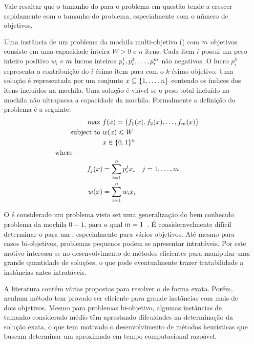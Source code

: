 Vale resaltar que o tamanho do \paretoset para o problema em questão
tende a crescer rapidamente com o tamanho do problema, especialmente com o
número de objetivos.

Uma instância de um problema da mochila multi-objetivo (\mokp{}) com $m$
objetivos consiste em uma capacidade inteira $W >0$ e $n$ itens.
Cada item $i$ possui um peso inteiro positivo $w_i$ e $m$ lucros inteiros
$p_i^1, p_i^2, \ldots, p_{i}^{m}$ não negativos.
O lucro $p_i^k$ representa a contribuição do $i$-ésimo item
para com o $k$-ésimo objetivo.
Uma solução é representada por um conjunto $x \subseteq \{1, \ldots, n\}$
contendo os índices dos itens incluídos na mochila.
Uma solução é viável se o peso total incluído na mochila não ultrapassa
a capacidade da mochila.
Formalmente a definição do problema é a seguinte:
\begin{align*}
  \text{max   } & f(x) =
    \big(f_1(x) ,f_2(x) ,\ldots ,f_{m}(x)\big) \\
  \text{subject to   } & w(x) \leqslant W \\
  & x \in \{0, 1\}^n\\
  \text{where} \phantom{mmmmm} \\
  f_j(x) &= \sum_{i = 1}^n p^j_i x_i \quad j = 1, \ldots, m\\
  w(x) &= \sum_{i = 1}^n w_i x_i
\end{align*}

O \mokp{} é considerado um problema \nphard{} visto set uma generalização
do bem conhecido problema da mochila $0-1$, para o qual $m = 1$~\cite{garey2002computers}.
É consideravelmente difícil determinar o \paretoset para um \mokp{},
especialmente para vários objetivos.
Até mesmo para casos bi-objetivos, problemas pequenos podem se apresentar
intratáveis.
Por este motivo interessa-se no desenvolvimento de métodos eficientes
para manipular uma grande quantidade de soluções, o que pode eventualmente
trazer tratabilidade a instâncias antes intratáveis.

A literatura contém várias propostas para resolver o \mokp{} de forma exata.
Porém, nenhum método tem provado ser eficiente para grande instâncias
com mais de dois objetivos.
Mesmo para problemas bi-objetivo, algumas instâncias de tamanho considerado
médio têm aprestando difculdades na determinação da solução exata, o que
tem motivado o desenvolvimento de métodos heurísticas que buscam determinar
um \paretoset aproximado em tempo computacional razoável.
